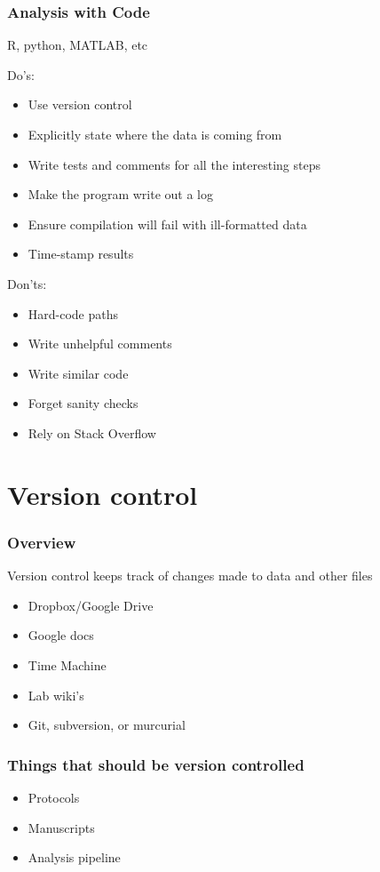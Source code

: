 \documentclass[10pt, compress]{beamer}
\begin{document}
\begin{frame}[fragile]
  \frametitle{Analysis with Code}
  R, python, MATLAB, etc

  Do's:
  \begin{itemize}
  \item Use version control
  \item Explicitly state where the data is coming from
  \item Write tests and comments for all the interesting steps
  \item Make the program write out a log
  \item Ensure compilation will fail with ill-formatted data
  \item Time-stamp results
  \end{itemize}
  Don'ts:
  \begin{itemize}
  \item Hard-code paths
  \item Write unhelpful comments
  \item Write similar code
  \item Forget sanity checks
  \item Rely on Stack Overflow
  \end{itemize}
\end{frame}

\section{Version control}

\begin{frame}[fragile]
  \frametitle{Overview}
  Version control keeps track of changes made to data and other files
  \begin{itemize}
  \item Dropbox/Google Drive
  \item Google docs
  \item Time Machine
    \item Lab wiki's
  \item Git, subversion, or murcurial
\end{itemize}
\end{frame}


\begin{frame}[fragile]
  \frametitle{Things that should be version controlled}
  \begin{itemize}
  \item Protocols
  \item Manuscripts
  \item Analysis pipeline
\end{itemize}
\end{frame}
\end{document}
